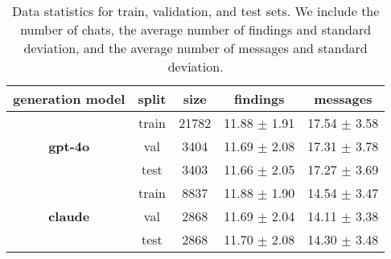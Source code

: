 \begin{table*}
    \centering
    \centering
    \begin{tabular}{c | c c c c}
        \toprule
        \textbf{generation model} & \textbf{split} & \textbf{size} & \textbf{findings} & \textbf{messages} \\ 
        \midrule
        \multirow{3}{*}{\textbf{gpt-4o}} 
        & train & 21782 & 11.88 $\pm$ 1.91 & 17.54 $\pm$ 3.58 \\ 
        & val & 3404 & 11.69 $\pm$ 2.08 & 17.31 $\pm$ 3.78 \\ 
        & test & 3403 & 11.66 $\pm$ 2.05 & 17.27 $\pm$ 3.69 \\ 
        \midrule
        \multirow{3}{*}{\textbf{claude}} 
        & train & 8837 & 11.88 $\pm$ 1.90 & 14.54 $\pm$ 3.47 \\ 
        & val & 2868 & 11.69 $\pm$ 2.04 & 14.11 $\pm$ 3.38 \\ 
        & test & 2868 & 11.70 $\pm$ 2.08 & 14.30 $\pm$ 3.48 \\ 
        \bottomrule
    \end{tabular}
    \caption{Data statistics for train, validation, and test sets.  We include the number of chats, the average number of findings and standard deviation, and the average number of messages and standard deviation.}
    \label{tab:data_details}

\end{table*}

